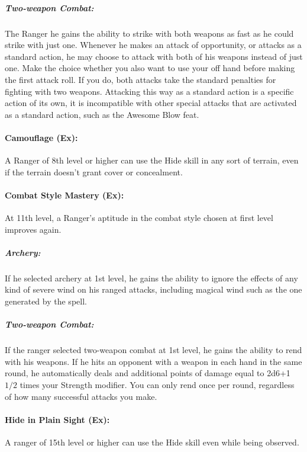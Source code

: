 \subparagraph{Two-weapon Combat:} The Ranger he gains the ability to strike with both weapons as fast as he could strike with just one.
Whenever he makes an attack of opportunity, or attacks as a standard action, he may choose to attack with both of his weapons instead of just one.
Make the choice whether you also want to use your off hand before making the first attack roll. If you do, both attacks take the standard penalties for fighting with two weapons.
Attacking this way as a standard action is a specific action of its own, it is incompatible with other special attacks that are activated as a standard action, such as the Awesome Blow feat.

\paragraph{Camouflage (Ex):}
A Ranger of 8th level or higher can use the Hide skill in any sort of terrain, even if the terrain doesn't grant cover or concealment.

\paragraph{Combat Style Mastery (Ex):}
At 11th level, a Ranger's aptitude in the combat style chosen at first level improves again.

\subparagraph{Archery:} If he selected archery at 1st level, he gains the ability to ignore the effects of any kind of severe wind on his ranged attacks, including magical wind such as the one generated by the  spell.

\subparagraph{Two-weapon Combat:} If the ranger selected two-weapon combat at 1st level, he gains the ability to rend with his weapons.
If he hits an opponent with a weapon in each hand in the same round, he automatically deals and additional points of damage equal to 2d6+1 $1/2$ times your Strength modifier. You can only rend once per round, regardless of how many successful attacks you make.

\paragraph{Hide in Plain Sight (Ex):}
A ranger of 15th level or higher can use the Hide skill even while being observed.

% 
% 

